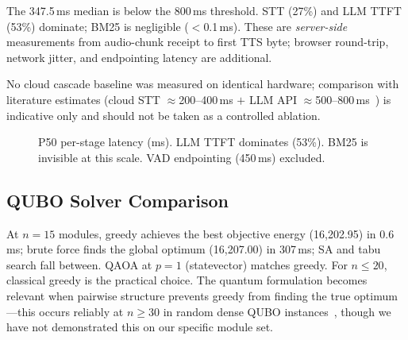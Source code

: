 \documentclass[journal]{IEEEtran}
\begin{document}
The 347.5\,ms median is below the 800\,ms threshold.
STT (27\%) and LLM TTFT (53\%) dominate; BM25 is negligible ($<$0.1\,ms).
These are \emph{server-side} measurements from audio-chunk receipt to
first TTS byte; browser round-trip, network jitter, and endpointing
latency are additional.

No cloud cascade baseline was measured on identical hardware; comparison
with literature estimates (cloud STT ${\approx}$200--400\,ms
$+$ LLM API ${\approx}$500--800\,ms~\cite{mctear2022}) is indicative
only and should not be taken as a controlled ablation.

\begin{figure}[!h]
\centering
{}
\caption{P50 per-stage latency (ms). LLM TTFT dominates (53\%). BM25 is invisible at this scale. VAD endpointing (450\,ms) excluded.}
\label{fig:latency_breakdown}
\end{figure}

\subsection{QUBO Solver Comparison}



At $n{=}15$ modules, greedy achieves the best objective energy (16{,}202.95)
in 0.6\,ms; brute force finds the global optimum (16{,}207.00) in 307\,ms;
SA and tabu search fall between. QAOA at $p{=}1$ (statevector) matches
greedy. For $n{\leq}20$, classical greedy is the practical choice.
The quantum formulation becomes relevant when pairwise structure prevents
greedy from finding the true optimum---this occurs reliably at $n \geq 30$
in random dense QUBO instances~\cite{date2023}, though we have not
demonstrated this on our specific module set.
\end{document}
